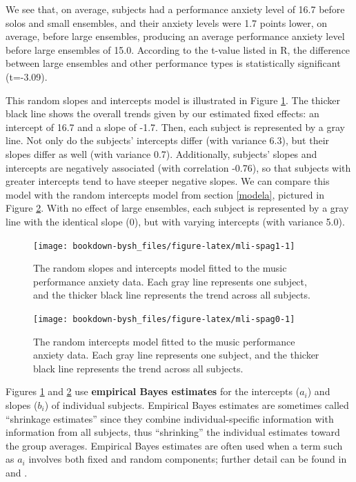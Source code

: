 \documentclass[
]{krantz}
\begin{document}
We see that, on average, subjects had a performance anxiety level of 16.7 before solos and small ensembles, and their anxiety levels were 1.7 points lower, on average, before large ensembles, producing an average performance anxiety level before large ensembles of 15.0. According to the t-value listed in R, the difference between large ensembles and other performance types is statistically significant (t=-3.09).

This random slopes and intercepts model is illustrated in Figure \ref{fig:mli-spag1}. The thicker black line shows the overall trends given by our estimated fixed effects: an intercept of 16.7 and a slope of -1.7. Then, each subject is represented by a gray line. Not only do the subjects' intercepts differ (with variance 6.3), but their slopes differ as well (with variance 0.7). Additionally, subjects' slopes and intercepts are negatively associated (with correlation -0.76), so that subjects with greater intercepts tend to have steeper negative slopes. We can compare this model with the random intercepts model from section \ref{modela}, pictured in Figure \ref{fig:mli-spag0}. With no effect of large ensembles, each subject is represented by a gray line with the identical slope (0), but with varying intercepts (with variance 5.0).

\begin{figure}

{\centering \texttt{[image: bookdown-bysh\_files/figure-latex/mli-spag1-1]} 

}

\caption{The random slopes and intercepts model fitted to the music performance anxiety data.  Each gray line represents one subject, and the thicker black line represents the trend across all subjects.}\label{fig:mli-spag1}
\end{figure}

\begin{figure}

{\centering \texttt{[image: bookdown-bysh\_files/figure-latex/mli-spag0-1]} 

}

\caption{The random intercepts model fitted to the music performance anxiety data.  Each gray line represents one subject, and the thicker black line represents the trend across all subjects.}\label{fig:mli-spag0}
\end{figure}

Figures \ref{fig:mli-spag1} and \ref{fig:mli-spag0} use \textbf{empirical Bayes estimates} for the intercepts (\(a_{i}\)) and slopes (\(b_{i}\)) of individual subjects. Empirical Bayes estimates are sometimes called ``shrinkage estimates'' since they combine individual-specific information with information from all subjects, thus ``shrinking'' the individual estimates toward the group averages. Empirical Bayes estimates are often used when a term such as \(a_{i}\) involves both fixed and random components; further detail can be found in \citet{Bryk2002} and \citet{Singer2003}.
\end{document}
